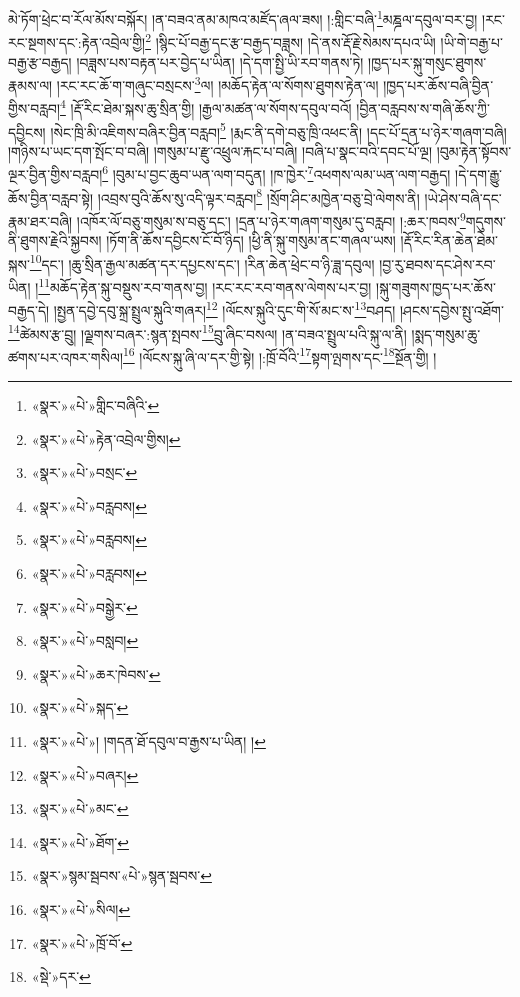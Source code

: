 མེ་ཏོག་ཕྲེང་བ་རོལ་མོས་བསྐོར། །ན་བཟའ་ནམ་མཁའ་མཛོད་ཞལ་ཟས། །:གླིང་བཞི་\footnote{«སྣར་»«པེ་»གླིང་བཞིའི་}མཎྜལ་དབུལ་བར་བྱ། །རང་རང་སྔགས་དང་:རྟེན་འབྲེལ་གྱི།\footnote{«སྣར་»«པེ་»རྟེན་འབྲེལ་གྱིས།} །སྙིང་པོ་བརྒྱ་དང་རྩ་བརྒྱད་བཟླས། །དེ་ནས་རྡོ་རྗེ་སེམས་དཔའ་ཡི། །ཡི་གེ་བརྒྱ་པ་བརྒྱ་རྩ་བརྒྱད། །བཟླས་པས་བརྟན་པར་བྱེད་པ་ཡིན། །དེ་དག་སྤྱི་ཡི་རབ་གནས་ཏེ། །ཁྱད་པར་སྐུ་གསུང་ཐུགས་རྣམས་ལ། །རང་རང་ཆོ་ག་གཞུང་བསྲངས་\footnote{«སྣར་»«པེ་»བསྲང་}ལ། །མཆོད་རྟེན་ལ་སོགས་ཐུགས་རྟེན་ལ། །ཁྱད་པར་ཆོས་བཞི་བྱིན་གྱིས་བརླབ།\footnote{«སྣར་»«པེ་»བརླབས།} །རྡོ་རིང་ཐེམ་སྐས་ཆུ་སྲིན་གྱི། །རྒྱལ་མཚན་ལ་སོགས་དབུལ་བའོ། །བྱིན་བརླབས་ས་གཞི་ཆོས་ཀྱི་དབྱིངས། །སེང་ཁྲི་མི་འཇིགས་བཞིར་བྱིན་བརླབ།\footnote{«སྣར་»«པེ་»བརླབས།} །རྨང་ནི་དགེ་བཅུ་ཁྲི་འཕང་ནི། །དང་པོ་དྲན་པ་ཉེར་གཞག་བཞི། །གཉིས་པ་ཡང་དག་སྤོང་བ་བཞི། །གསུམ་པ་རྫུ་འཕྲུལ་རྐང་པ་བཞི། །བཞི་པ་སྣང་བའི་དབང་པོ་ལྔ། །བུམ་རྟེན་སྟོབས་ལྔར་བྱིན་གྱིས་བརླབ།\footnote{«སྣར་»«པེ་»བརླབས།} །བུམ་པ་བྱང་ཆུབ་ཡན་ལག་བདུན། །ཁ་ཁྱེར་\footnote{«སྣར་»«པེ་»བསྒྱེར་}འཕགས་ལམ་ཡན་ལག་བརྒྱད། །དེ་དག་རྒྱུ་ཆོས་བྱིན་བརླབ་སྟེ། །འབྲས་བུའི་ཆོས་སུ་འདི་ལྟར་བརླབ།\footnote{«སྣར་»«པེ་»བསླབ།} །སྲོག་ཤིང་མཁྱེན་བཅུ་བྲེ་ལེགས་ནི། །ཡེ་ཤེས་བཞི་དང་རྣམ་ཐར་བཞི། །འཁོར་ལོ་བཅུ་གསུམ་ས་བཅུ་དང་། །དྲན་པ་ཉེར་གཞག་གསུམ་དུ་བརླབ། །:ཆར་ཁབས་\footnote{«སྣར་»«པེ་»ཆར་ཁེབས་}གདུགས་ནི་ཐུགས་རྗེའི་སྐྱབས། །ཏོག་ནི་ཆོས་དབྱིངས་ངོ་བོ་ཉིད། །ཕྱི་ནི་སྐུ་གསུམ་ནང་གཞལ་ཡས། །རྡོ་རིང་རིན་ཆེན་ཐེམ་སྐས་\footnote{«སྣར་»«པེ་»སྐད་}དང་། །ཆུ་སྲིན་རྒྱལ་མཚན་དར་དཔྱངས་དང་། །རིན་ཆེན་ཕྲེང་བ་ཉི་ཟླ་དབུལ། །བྱ་རུ་ཐབས་དང་ཤེས་རབ་ཡིན། །\footnote{«སྣར་»«པེ་»། །གདན་ཐོ་དབུལ་བ་རྒྱས་པ་ཡིན། །}མཆོད་རྟེན་སྐུ་བསྡུས་རབ་གནས་བྱ། །རང་རང་རབ་གནས་ལེགས་པར་བྱ། །སྐུ་གཟུགས་ཁྱད་པར་ཆོས་བརྒྱད་དེ། །སྤྱན་དབྱེ་དབུ་སྐྲ་སྤྲུལ་སྐུའི་གཞར།\footnote{«སྣར་»«པེ་»བཞར།} །ལོངས་སྐུའི་དུང་གི་སོ་མང་ས་\footnote{«སྣར་»«པེ་»མང་}བཤད། །ཤངས་དབྱེས་སྤུ་འཐོག་\footnote{«སྣར་»«པེ་»ཐོག་}ཚེམས་རྩ་བྲུ། །ལྗགས་བཞར་:སྙན་སྤབས་\footnote{«སྣར་»སྙམ་སྦབས་«པེ་»སྙན་སྦབས་}བྲུ་ཞིང་བསལ། །ན་བཟའ་སྤྲུལ་པའི་སྐུ་ལ་ནི། །སྨད་གསུམ་ཆུ་ཚགས་པར་འཁར་གསིལ།\footnote{«སྣར་»«པེ་»སིལ།} །ལོངས་སྐུ་ཞི་ལ་དར་གྱི་སྟེ། །:ཁྲོ་བོའི་\footnote{«སྣར་»«པེ་»ཁྲོ་བོ་}སྟག་ལྤགས་དང་\footnote{«སྡེ་»དར་}སྔོན་གྱི། །
